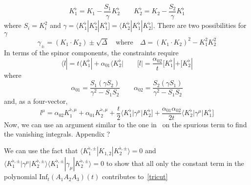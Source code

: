 \begin{equation*}
K_1^\flat = K_1 - \frac{S_1}{\gamma}K_2^\flat \quad\quad
K_2^\flat = K_2 - \frac{S_2}{\gamma}K_1^\flat
\end{equation*}
%
where $S_i = K_i^2$ and $\gamma = \langle K_1^\flat|K_2^\flat|K_1^\flat] =\langle K_2^\flat|K_1^\flat|K_2^\flat]$.
There are two possibilities for $\gamma$
\begin{equation*}
\gamma_{\pm} = (K_1\cdot K_2) \pm\sqrt{\Delta}\quad
\mathrm{where}\quad
\Delta = (K_1\cdot K_2)^2 - K_1^2K_2^2
\end{equation*}
In terms of the spinor components, the constraints require
\begin{equation*}
\langle l | = t\langle K_1^\flat| + \alpha_{01}\langle K_2^\flat| \quad\quad
[ l | = \frac{\alpha_{02}}{t}[ K_1^\flat| + [ K_2^\flat|
\end{equation*}
where
\begin{equation*}
\alpha_{01} = \frac{S_1(\gamma S_2)}{\gamma^2 - S_1S_2}\quad \quad
\alpha_{02} = \frac{S_2(\gamma S_1)}{\gamma^2 - S_1S_2}
\end{equation*}
%
and, as a four-vector,
\begin{equation*}
l^\mu = \alpha_{02} K_1^{\flat,\mu} + \alpha_{01}K_2^{\flat,\mu} + \frac{t}{2}\langle K_1^\flat | \gamma^\mu |K_2^\flat] + \frac{\alpha_{01}\alpha_{02}}{2t}\langle K_2^\flat|\gamma^\mu |K_1^\flat]
\end{equation*}
%
Now, we can use an argument similar to the one in~\cite{Ossola:2006us} on the spurious term to find the vanishing integrals.
\color{red}Appendix ?\color{black}
%
\iffalse
To illustrate this argument, we consider the case of a rank-1 3-point-like integral. 
By simple arguments on the rank and the dependence on external momenta, 
\begin{equation*}
\int\dd^D q \frac{q^\mu}{D_0(q)D_1(q+p_1)D_2(q+p_2)} = c_1p_1^\mu + c_2p_2^\mu
\end{equation*}
If we contract the above relation with a vector $v^\mu$ orthogonal to $p_1$ and $p_2$, we obtain a vanishing integral.
$q\cdot v$ is hence a spurious term.
The same technique can be applied to show that $(q\cdot v)^n$ is spurious for any $n>0$. 
\fi
%
We can use the fact that $\langle K_1^{\flat,\pm} | K_{1,2}|K_2^{\flat,\pm}\rangle = 0 $ and $\langle K_1^{\flat,\pm}|\gamma^\mu|K_{2}^{\flat,\pm}\rangle\langle K_1^{\flat,\pm}|\gamma_\mu|K_{2}^{\flat,\pm}\rangle = 0$
to show that all only the constant term in the polynomial $\mathrm{Inf}_t(A_1A_2A_3)(t)$ contributes to~\cref{tricut}
%
%

